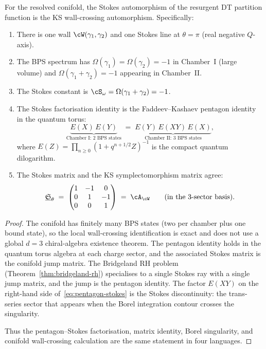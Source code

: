 \begin{theorem}[Stokes \texorpdfstring{$=$}{=} WC for the conifold]
\label{thm:stokes-wc-conifold}
For the resolved conifold, the Stokes automorphism of the resurgent DT partition function is the KS wall-crossing automorphism. Specifically:
\begin{enumerate}[label=\textup{(\roman*)}]
 \item There is one wall $\cW(\gamma_1, \gamma_2)$ and one Stokes line at $\theta = \pi$ \textup{(}real negative $Q$-axis\textup{)}.
 \item The BPS spectrum has $\Omega(\gamma_1) = \Omega(\gamma_2) = -1$ in Chamber~I \textup{(}large volume\textup{)} and $\Omega(\gamma_1 + \gamma_2) = -1$ appearing in Chamber~II.
 \item The Stokes constant is $\cS_\omega = \Omega(\gamma_1 + \gamma_2) = -1$.
 \item The Stokes factorisation identity is the Faddeev--Kashaev pentagon identity in the quantum torus:
 \begin{equation}
 \label{eq:pentagon-stokes}
 \underbrace{E(X)\, E(Y)}_{\text{Chamber I: 2 BPS states}} \;=\; \underbrace{E(Y)\, E(XY)\, E(X)}_{\text{Chamber II: 3 BPS states}},
 \end{equation}
 where $E(Z) = \prod_{n \geq 0} (1 + q^{n+1/2} Z)^{-1}$ is the compact quantum dilogarithm.
 \item The Stokes matrix and the KS symplectomorphism matrix agree:
 \[
 \underline{\mathfrak{S}}_\theta \;=\; \begin{pmatrix} 1 & -1 & 0 \\ 0 & 1 & -1 \\ 0 & 0 & 1 \end{pmatrix} \;=\; \cA_\cW \qquad \text{\textup{(}in the 3-sector basis\textup{)}}.
 \]
\end{enumerate}
\end{theorem}

\begin{proof}
The conifold has finitely many BPS states (two per chamber plus one bound state), so the local wall-crossing identification is exact and does not use a global $d=3$ chiral-algebra existence theorem. The pentagon identity holds in the quantum torus algebra at each charge sector, and the associated Stokes matrix is the conifold jump matrix. The Bridgeland RH problem (Theorem~\ref{thm:bridgeland-rh}) specialises to a single Stokes ray with a single jump matrix, and the jump is the pentagon identity. The factor $E(XY)$ on the right-hand side of~\eqref{eq:pentagon-stokes} is the Stokes discontinuity: the trans-series sector that appears when the Borel integration contour crosses the singularity.

\smallskip\noindent Thus the pentagon--Stokes factorisation, matrix identity, Borel singularity, and conifold wall-crossing calculation are the same statement in four languages.
\end{proof}

